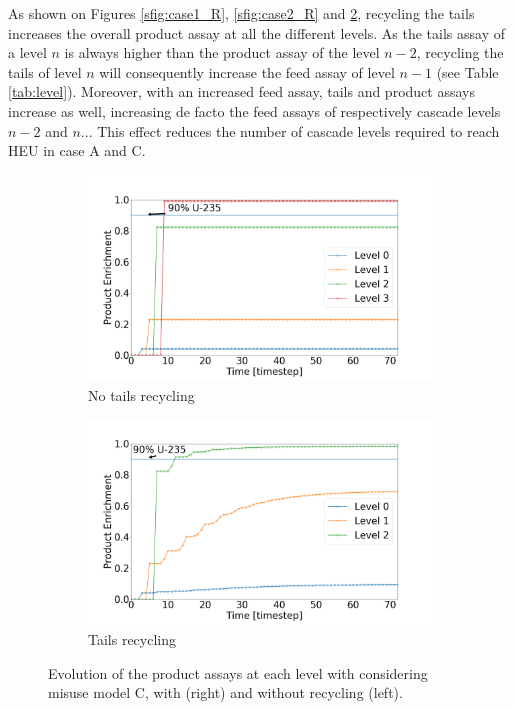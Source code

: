 As shown on Figures \ref{sfig:case1_R}, \ref{sfig:case2_R} and
\ref{sfig:case3_R}, recycling the tails increases the overall product assay at
all the different levels. As the tails assay of a level $n$ is always higher than
the product assay of the level $n-2$, recycling the tails of level $n$ will
consequently increase the feed assay of level $n-1$ (see Table \ref{tab:level}).
Moreover, with an increased feed assay, tails and product assays increase as
well, increasing de facto the feed assays of respectively cascade levels $n-2$
and $n$...  This effect reduces the number of cascade levels required to reach
\gls{HEU} in case A and C.

\begin{figure}[h!]
    \centering
    \begin{subfigure}[t]{0.45\textwidth}
        \centering
        \includegraphics[scale=0.17]{NR_case3}
        \caption{No tails recycling}
        \label{sfig:case3_NR}
    \end{subfigure}%
    \begin{subfigure}[t]{0.45\textwidth}
        \centering
        \includegraphics[scale=0.17]{R_case3}
        \caption{Tails recycling}
        \label{sfig:case3_R}
    \end{subfigure}
    \caption{Evolution of the product assays at each level with considering
    misuse model C, with (right) and without recycling (left).}
    \label{fig:case3}
\end{figure}



